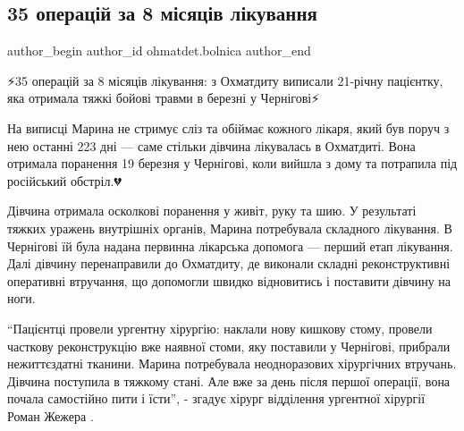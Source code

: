  
 
 
 
 
 
\subsection{35 операцій за 8 місяців лікування}
\label{sec:02_12_2022.fb.ohmatdet.bolnica.1.35_operacij_divchynka}
 
\ifcmt
 author_begin
   author_id ohmatdet.bolnica
 author_end
\fi

⚡️35 операцій за 8 місяців лікування: з Охматдиту виписали 21-річну пацієнтку,
яка отримала тяжкі бойові травми в березні у Чернігові⚡️

На виписці Марина не стримує сліз та обіймає кожного лікаря, який був поруч з
нею останні 223 дні — саме стільки дівчина лікувалась в Охматдиті. Вона
отримала поранення 19 березня у Чернігові, коли вийшла з дому та потрапила під
російський обстріл.💔


Дівчина отримала осколкові поранення у живіт, руку та шию. У результаті тяжких
уражень внутрішніх органів, Марина потребувала складного лікування. В Чернігові
їй була надана первинна лікарська допомога — перший етап лікування. Далі
дівчину перенаправили до Охматдиту, де виконали складні реконструктивні
оперативні втручання, що допомогли швидко відновитись і поставити дівчину на
ноги.🙏🏻


\enquote{Пацієнтці провели ургентну хірургію: наклали нову кишкову стому, провели
часткову реконструкцію вже наявної стоми, яку поставили у Чернігові, прибрали
нежиттєздатні тканини. Марина потребувала неодноразових хірургічних втручань.
Дівчина поступила в тяжкому стані. Але вже за день після першої операції, вона
почала самостійно пити і їсти}, - згадує хірург відділення ургентної хірургії
Роман Жежера .💪🏻


